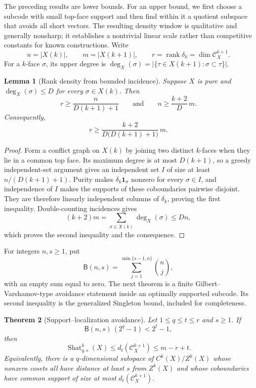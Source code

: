 \documentclass[11pt,letterpaper]{article}
\theoremstyle{plain}
\newtheorem{theorem}{Theorem}[section]
\newtheorem{lemma}[theorem]{Lemma}
\theoremstyle{definition}
\newcommand{\cC}{\mathcal{C}}
\newcommand{\rank}{\operatorname{rank}}
\newcommand{\Shat}{\operatorname{Shat}}
\newcommand{\1}{\mathbf{1}}
\newcommand{\abs}[1]{\left|#1\right|}
\begin{document}
The preceding results are lower bounds.  For an upper bound, we first choose a
subcode with small top-face support and then find within it a quotient subspace that
avoids all short vectors.  The resulting density window is qualitative and generally
nonsharp; it establishes a nontrivial linear scale rather than competitive constants
for known constructions.  Write
\[
 n=\abs{X(k)},\qquad m=\abs{X(k+1)},\qquad
 r=\rank\delta_k=\dim\cC_X^{k+1}.
\]
For a $k$-face $\sigma$, its upper degree is
$\deg_X(\sigma)=\abs{\{\tau\in X(k+1):\sigma\subset\tau\}}$.

\begin{lemma}[Rank density from bounded incidence]
\label{lem:rank-density}
Suppose $X$ is pure and $\deg_X(\sigma)\le D$ for every $\sigma\in X(k)$.  Then
\begin{equation}\label{eq:rank-density}
 r\ge \frac{n}{D(k+1)+1}
 \qquad\text{and}\qquad
 n\ge\frac{k+2}{D}\,m.
\end{equation}
Consequently,
\[
 r\ge \frac{k+2}{D\bigl(D(k+1)+1\bigr)}\,m.
\]
\end{lemma}

\begin{proof}
Form a conflict graph on $X(k)$ by joining two distinct $k$-faces when they lie in a
common top face.  Its maximum degree is at most $D(k+1)$, so a greedy independent-set
argument gives an independent set $I$ of size at least $n/(D(k+1)+1)$.  Purity makes
$\delta_k\1_\sigma$ nonzero for every $\sigma\in I$, and independence of $I$ makes the
supports of these coboundaries pairwise disjoint.  They are therefore linearly
independent columns of $\delta_k$, proving the first inequality.  Double-counting
incidences gives
\[
 (k+2)m=\sum_{\sigma\in X(k)}\deg_X(\sigma)\le Dn,
\]
which proves the second inequality and the consequence.
\end{proof}

For integers $n,s\ge1$, put
\[
 \mathsf B(n,s)=\sum_{j=1}^{\min\{s-1,n\}}\binom{n}{j},
\]
with an empty sum equal to zero.  The next theorem is a finite
Gilbert--Varshamov-type avoidance statement inside an optimally supported subcode.  Its
second inequality is the generalized Singleton bound, included for completeness.

\begin{theorem}[Support--localization avoidance]
\label{thm:localized-existence}
Let $1\le q\le t\le r$ and $s\ge1$.  If
\begin{equation}\label{eq:localized-existence-condition}
 \mathsf B(n,s)\,(2^q-1)<2^t-1,
\end{equation}
then
\begin{equation}\label{eq:localized-existence-conclusion}
 \Shat_{q,s}^k(X)
 \le d_t(\cC_X^{k+1})
 \le m-r+t.
\end{equation}
Equivalently, there is a $q$-dimensional subspace of $C^k(X)/Z^k(X)$ whose nonzero
cosets all have distance at least $s$ from $Z^k(X)$ and whose coboundaries have common
support of size at most $d_t(\cC_X^{k+1})$.
\end{theorem}
\end{document}
